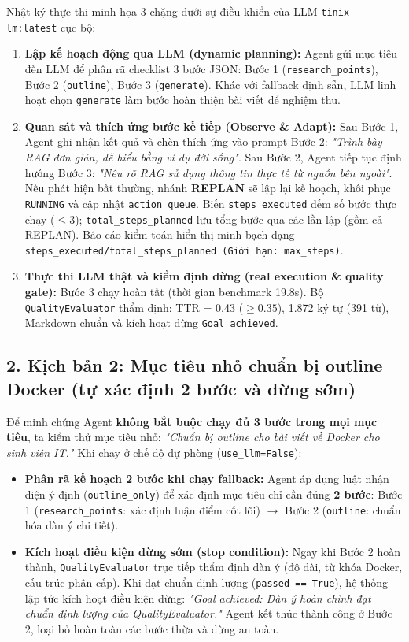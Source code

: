 \documentclass[]{article}
\providecommand{\tightlist}{%
  \setlength{\itemsep}{0pt}\setlength{\parskip}{0pt}}
\begin{document}
Nhật ký thực thi minh họa 3 chặng dưới sự điều khiển của LLM \texttt{tinix-lm:latest} cục bộ:
\begin{enumerate}
    \tightlist
    \item \textbf{Lập kế hoạch động qua LLM (dynamic planning):} Agent gửi mục tiêu đến LLM để phân rã checklist 3 bước JSON: Bước 1 (\texttt{research\_points}), Bước 2 (\texttt{outline}), Bước 3 (\texttt{generate}). Khác với fallback định sẵn, LLM linh hoạt chọn \texttt{generate} làm bước hoàn thiện bài viết để nghiệm thu.
    \item \textbf{Quan sát và thích ứng bước kế tiếp (Observe \& Adapt):} Sau Bước 1, Agent ghi nhận kết quả và chèn thích ứng vào prompt Bước 2: \textit{"Trình bày RAG đơn giản, dễ hiểu bằng ví dụ đời sống"}. Sau Bước 2, Agent tiếp tục định hướng Bước 3: \textit{"Nêu rõ RAG sử dụng thông tin thực tế từ nguồn bên ngoài"}. Nếu phát hiện bất thường, nhánh \textbf{REPLAN} sẽ lập lại kế hoạch, khôi phục \texttt{RUNNING} và cập nhật \texttt{action\_queue}. Biến \texttt{steps\_executed} đếm số bước thực chạy ($\le 3$); \texttt{total\_steps\_planned} lưu tổng bước qua các lần lập (gồm cả REPLAN). Báo cáo kiểm toán hiển thị minh bạch dạng \texttt{steps\_executed/total\_steps\_planned (Giới hạn: max\_steps)}.
    \item \textbf{Thực thi LLM thật và kiểm định dừng (real execution \& quality gate):} Bước 3 chạy hoàn tất (thời gian benchmark 19.8s). Bộ \texttt{QualityEvaluator} thẩm định: TTR = 0.43 ($\ge 0.35$), 1.872 ký tự (391 từ), Markdown chuẩn và kích hoạt dừng \texttt{Goal achieved}.
\end{enumerate}

\vspace{-3mm}
\subsection{2. Kịch bản 2: Mục tiêu nhỏ chuẩn bị outline Docker (tự xác định 2 bước và dừng sớm)}
Để minh chứng Agent \textbf{không bắt buộc chạy đủ 3 bước trong mọi mục tiêu}, ta kiểm thử mục tiêu nhỏ: \textit{"Chuẩn bị outline cho bài viết về Docker cho sinh viên IT."} Khi chạy ở chế độ dự phòng (\texttt{use\_llm=False}):
\begin{itemize}
    \tightlist
    \item \textbf{Phân rã kế hoạch 2 bước khi chạy fallback:} Agent áp dụng luật nhận diện ý định (\texttt{outline\_only}) để xác định mục tiêu chỉ cần đúng \textbf{2 bước}: Bước 1 (\texttt{research\_points}: xác định luận điểm cốt lõi) $\rightarrow$ Bước 2 (\texttt{outline}: chuẩn hóa dàn ý chi tiết).
    \item \textbf{Kích hoạt điều kiện dừng sớm (stop condition):} Ngay khi Bước 2 hoàn thành, \texttt{QualityEvaluator} trực tiếp thẩm định dàn ý (độ dài, từ khóa Docker, cấu trúc phân cấp). Khi đạt chuẩn định lượng (\texttt{passed == True}), hệ thống lập tức kích hoạt điều kiện dừng: \textit{"Goal achieved: Dàn ý hoàn chỉnh đạt chuẩn định lượng của QualityEvaluator."} Agent kết thúc thành công ở Bước 2, loại bỏ hoàn toàn các bước thừa và dừng an toàn.
\end{itemize}
\end{document}
